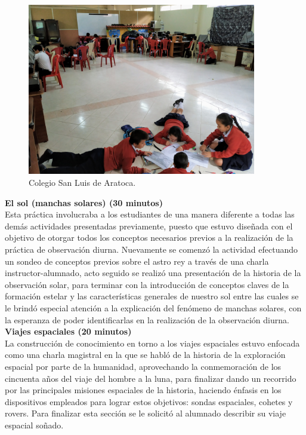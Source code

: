 \documentclass[a4paper,10pt]{article}
\begin{document}
\begin{figure}[H]
    \centering
    \includegraphics[width=10cm]{J-S/Bc.jpg}
    \caption{Colegio San Luis de Aratoca.}
    \label{fig: bovedaceleste}
\end{figure}

\noindent \textbf{El sol (manchas solares) (30 minutos)}\\

\noindent Esta práctica involucraba a los estudiantes de una manera diferente a todas las demás actividades presentadas previamente, puesto que estuvo diseñada con el objetivo de otorgar todos los conceptos necesarios previos a la realización de la práctica de observación diurna. Nuevamente se comenzó la actividad efectuando un sondeo de conceptos previos sobre el astro rey a través de una charla instructor-alumnado, acto seguido se realizó una presentación de la historia de la observación solar, para terminar con la introducción de conceptos claves de la formación estelar y las características generales de nuestro sol entre las cuales se le brindó especial atención a la explicación del fenómeno de manchas solares, con la esperanza de poder identificarlas en la realización de la observación diurna.\\

\noindent \textbf{Viajes espaciales (20 minutos)}\\

\noindent La construcción de conocimiento en torno a los viajes espaciales estuvo enfocada como una charla magistral en la que se habló de la historia de la exploración espacial por parte de la humanidad, aprovechando la conmemoración de los cincuenta años del viaje del hombre a la luna, para finalizar dando un recorrido por las principales misiones espaciales de la historia, haciendo énfasis en los dispositivos empleados para lograr estos objetivos: sondas espaciales, cohetes y rovers. Para finalizar esta sección se le solicitó al alumnado describir su viaje espacial soñado.\\
\end{document}
